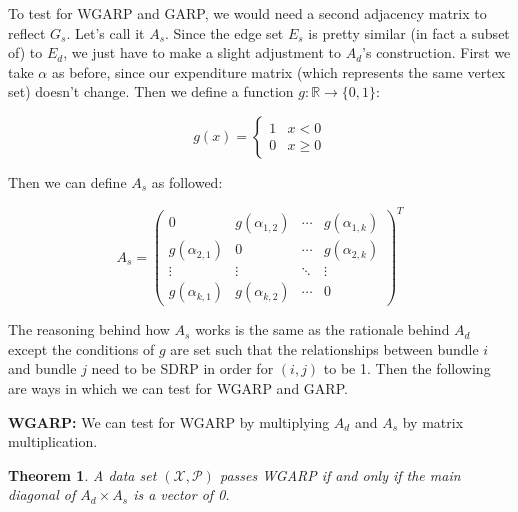 \documentclass{article} %
\newtheorem{theorem}{Theorem}
\begin{document}
To test for WGARP and GARP, we would need a second adjacency matrix to reflect $G_s$. Let's call it $A_s$. Since the edge set $E_s$ is pretty similar (in fact a subset of) to $E_d$, we just have to make a slight adjustment to $A_d$'s construction. First we take $\alpha$ as before, since our expenditure matrix (which represents the same vertex set) doesn't change. Then we define a function $g:\mathbb{R}\to\{0,1\}$:

\[ 
g(x)=
    \begin{cases} 
      1 & x<0 \\
      0 & x\geq0
   \end{cases}
\]

Then we can define $A_s$ as followed:

\[
A_s =
 \begin{pmatrix}
  0 & g(\alpha_{1,2}) & \cdots & g(\alpha_{1,k}) \\
  g(\alpha_{2,1}) & 0 & \cdots & g(\alpha_{2,k}) \\
  \vdots  & \vdots  & \ddots & \vdots  \\
  g(\alpha_{k,1}) & g(\alpha_{k,2}) & \cdots & 0
 \end{pmatrix} ^T
\]

The reasoning behind how $A_s$ works is the same as the rationale behind $A_d$ except the conditions of $g$ are set such that the relationships between bundle $i$ and bundle $j$ need to be SDRP in order for $(i,j)$ to be 1. Then the following are ways in which we can test for WGARP and GARP.


\textbf{WGARP:} We can test for WGARP by multiplying $A_d$ and $A_s$ by matrix multiplication.

\begin{theorem}
\label{thm:WGARP}
A data set $(\mathcal{X}, \mathcal{P})$ passes WGARP if and only if the main diagonal of $A_d \times A_s$ is a vector of 0. 
\end{theorem}
\end{document}
